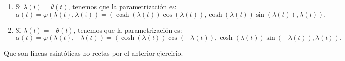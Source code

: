 \begin{enumerate}
    \item Si $\lambda\left( t \right) = \theta\left( t \right)$, tenemos que la
        parametrización es:
    \[
        \alpha\left( t \right) = \varphi\left( \lambda\left( t \right),
        \lambda\left( t \right) \right) = \boxed{\left( \cosh\left(
            \lambda\left( t \right) \right)\cos \left( \lambda\left( t \right)
        \right), \cosh\left( \lambda\left( t \right) \right)\sin \left(
        \lambda\left( t \right) \right), \lambda\left( t \right) \right)}.
    \]
    \item Si $\lambda\left( t \right) = -\theta\left( t \right)$, tenemos que la
        parametrización es:
    \[
        \alpha\left( t \right) = \varphi\left( \lambda\left( t \right),
        -\lambda\left( t \right) \right) = \boxed{\left( \cosh\left(
        \lambda\left( t \right) \right)\cos \left( -\lambda\left( t \right)
        \right), \cosh\left( \lambda\left( t \right) \right)\sin \left(
        -\lambda\left( t \right) \right), \lambda\left( t \right) \right)}.
    \]
\end{enumerate}
Que son líneas asintóticas no rectas por el anterior ejercicio.
